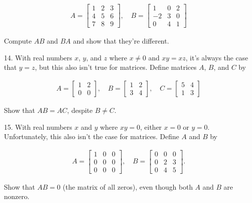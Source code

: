 \documentclass{article}
\begin{document}
\begin{align*}
	A = \left[\begin{array}{ccc}1& 2& 3 \\ 4& 5& 6 \\ 7& 8& 9\end{array}\right], \quad B = \left[\begin{array}{ccc}1& 0& 2 \\ -2& 3& 0 \\ 0& 4& 1\end{array}\right]
\end{align*}

Compute $AB$ and $BA$ and show that they're different.

14. With real numbers $x$, $y$, and $z$ where $x \neq 0$ and $xy = xz$, it's always the case that $y = z$, but this also isn't true for matrices. Define matrices $A$, $B$, and $C$ by

\begin{align*}
	A = \left[\begin{array}{cc}1& 2 \\ 0& 0\end{array}\right], \quad B = \left[\begin{array}{cc}1& 2 \\ 3& 4\end{array}\right], \quad C = \left[\begin{array}{cc}5& 4 \\ 1& 3\end{array}\right]
\end{align*}

Show that $AB = AC$, despite $B \neq C$.

15. With real numbers $x$ and $y$ where $xy = 0$, either $x = 0$ or $y = 0$. Unfortunately, this also isn't the case for matrices. Define $A$ and $B$ by

\begin{align*}
	A = \left[\begin{array}{ccc}1& 0& 0 \\ 0& 0& 0 \\ 0& 0& 0\end{array}\right], \quad B = \left[\begin{array}{ccc}0& 0& 0 \\ 0& 2& 3 \\ 0& 4& 5\end{array}\right].
\end{align*}

Show that $AB = 0$ (the matrix of all zeros), even though both $A$ and $B$ are nonzero.
\end{document}

